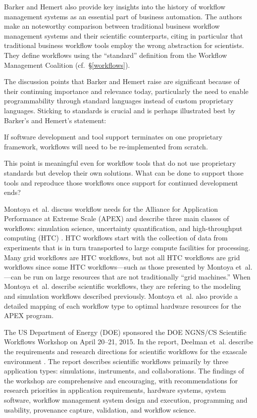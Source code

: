 Barker and Hemert also provide key insights into the history of workflow
management systems as an essential part of business automation. The authors make
an noteworthy comparison between traditional business workflow management
systems and their scientific counterparts, citing in particular that traditional
business workflow tools employ the wrong abstraction for scientists. They define
workflows using the ``standard'' definition from the Workflow Management
Coalition (cf.~\S \ref{workflows}).

The discussion points that Barker and Hemert raise are significant because of
their continuing importance and relevance today, particularly the need to enable
programmability through standard languages instead of custom proprietary
languages. Sticking to standards is crucial and is perhaps illustrated best
by Barker's and Hemert's statement:

\begin{displayquote} If software development and tool support terminates on one
proprietary framework, workflows will need to be re-implemented from scratch.
\end{displayquote}

This point is meaningful even for workflow tools that do not use proprietary
standards but develop their own solutions. What can be done to support those
tools and reproduce those workflows once support for continued development ends?

Montoya et~al. discuss workflow needs for the Alliance for Application
Performance at Extreme Scale (APEX) \cite{nersc_apex_2016} and describe three
main classes of workflows: simulation science, uncertainty quantification,
and high-throughput computing (HTC) \cite{montoya_apex_2016}.  HTC workflows
start with the collection of data from experiments that is in turn transported
to large compute facilities for processing. Many grid workflows are HTC
workflows, but not all HTC workflows are grid workflows since some HTC
workflows---such as those presented by Montoya et~al.---can be run on large
resources that are not traditionally ``grid machines.'' When Montoya et~al.
describe scientific workflows, they are refering to the modeling and simulation
workflows described previously. Montoya et~al. also provide a detailed mapping
of each workflow type to optimal hardware resources for the APEX program.

The US Department of Energy (DOE) sponsored the DOE NGNS/CS Scientific
Workflows Workshop on April 20--21, 2015. In the report, Deelman et~al.
describe the requirements and research directions for scientific workflows for
the exascale environment \cite{deelman_future_2015}\cite{deelman_future_2017}.
The report describes scientific workflows primarily by three
application types: simulations, instruments, and collaborations. The findings of
the workshop are comprehensive and encouraging, with recommendations for
research priorities in application requirements, hardware systems, system
software, workflow management system design and execution, programming and
usability, provenance capture, validation, and workflow science.

